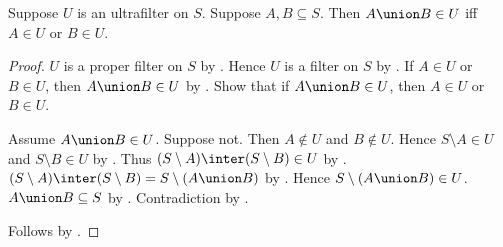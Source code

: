 \begin{proposition}\label{ultrafilter_union_in_iff}
    Suppose $U$ is an ultrafilter on $S$.
    Suppose $A,B\subseteq S$.
    Then $A\union B\in U$ iff $A\in U$ or $B\in U$.
\end{proposition}
\begin{proof}
    $U$ is a proper filter on $S$ by .
    Hence $U$ is a filter on $S$ by .
    If $A\in U$ or $B\in U$, then $A\union B\in U$
        by .
    Show that if $A\union B\in U$, then $A\in U$ or $B\in U$.
    \begin{subproof}
        Assume $A\union B\in U$.
        Suppose not.
        Then $A\notin U$ and $B\notin U$.
        Hence $S\setminus A\in U$ and $S\setminus B\in U$
            by .
        Thus $(S\setminus A)\inter(S\setminus B)\in U$
            by .
        $(S\setminus A)\inter(S\setminus B)=S\setminus(A\union B)$
            by .
        Hence $S\setminus(A\union B)\in U$.
        $A\union B\subseteq S$ by .
        Contradiction by .
    \end{subproof}
    Follows by \auto.
\end{proof}


